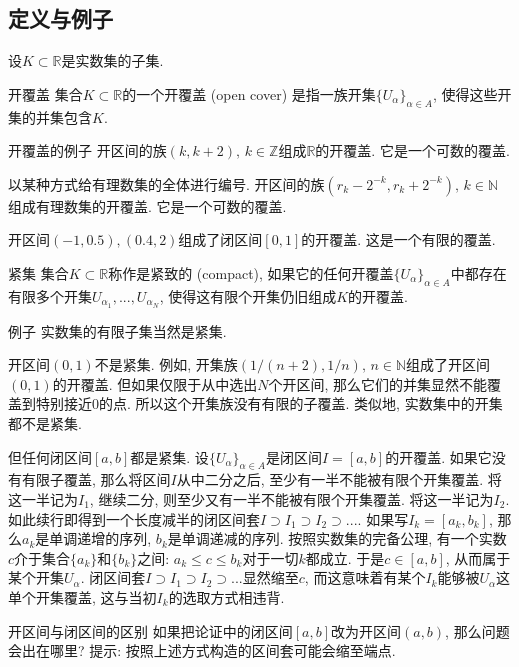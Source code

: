 \subsection{定义与例子}
设$K\subset\mathbb{R}$是实数集的子集.
\begin{definition}{开覆盖}
集合$K\subset\mathbb{R}$的一个开覆盖 (open cover) 是指一族开集$\{U_{\alpha}\}_{\alpha\in A}$, 使得这些开集的并集包含$K$.
\end{definition}

\begin{example}{开覆盖的例子}
开区间的族$(k,k+2),\,k\in\mathbb{Z}$组成$\mathbb{R}$的开覆盖. 它是一个可数的覆盖.

以某种方式给有理数集的全体进行编号. 开区间的族$(r_k-2^{-k},r_k+2^{-k}),\,k\in\mathbb{N}$组成有理数集的开覆盖. 它是一个可数的覆盖.

开区间$(-1,0.5),(0.4,2)$组成了闭区间$[0,1]$的开覆盖. 这是一个有限的覆盖.
\end{example}

\begin{definition}{紧集}
集合$K\subset\mathbb{R}$称作是紧致的 (compact), 如果它的任何开覆盖$\{U_{\alpha}\}_{\alpha\in A}$中都存在有限多个开集$U_{\alpha_1},...,U_{\alpha_N}$, 使得这有限个开集仍旧组成$K$的开覆盖. 
\end{definition}

\begin{example}{例子}
实数集的有限子集当然是紧集.

开区间$(0,1)$不是紧集. 例如, 开集族$(1/(n+2),1/n),\,n\in\mathbb{N}$组成了开区间$(0,1)$的开覆盖. 但如果仅限于从中选出$N$个开区间, 那么它们的并集显然不能覆盖到特别接近$0$的点. 所以这个开集族没有有限的子覆盖. 类似地, 实数集中的开集都不是紧集.

但任何闭区间$[a,b]$都是紧集. 设$\{U_\alpha\}_{\alpha\in A}$是闭区间$I=[a,b]$的开覆盖. 如果它没有有限子覆盖, 那么将区间$I$从中二分之后, 至少有一半不能被有限个开集覆盖. 将这一半记为$I_1$, 继续二分, 则至少又有一半不能被有限个开集覆盖. 将这一半记为$I_2$. 如此续行即得到一个长度减半的闭区间套$I\supset I_1\supset I_2\supset...$. 如果写$I_k=[a_k,b_k]$, 那么$a_k$是单调递增的序列, $b_k$是单调递减的序列. 按照实数集的完备公理, 有一个实数$c$介于集合$\{a_k\}$和$\{b_k\}$之间: $a_k\leq c\leq b_k$对于一切$k$都成立. 于是$c\in[a,b]$, 从而属于某个开集$U_\alpha$. 闭区间套$I\supset I_1\supset I_2\supset...$显然缩至$c$, 而这意味着有某个$I_k$能够被$U_\alpha$这单个开集覆盖, 这与当初$I_k$的选取方式相违背.
\end{example}

\begin{exercise}{开区间与闭区间的区别}
如果把论证中的闭区间$[a,b]$改为开区间$(a,b)$, 那么问题会出在哪里? 提示: 按照上述方式构造的区间套可能会缩至端点.
\end{exercise}

